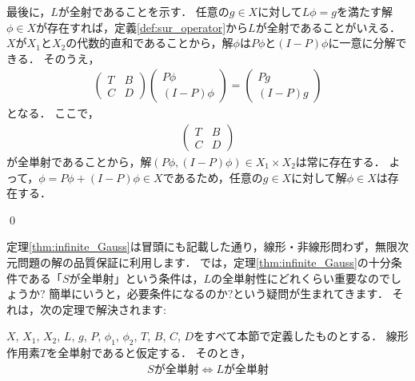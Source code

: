 \begin{Proof}
最後に，$L$が全射であることを示す．
任意の$g \in X$に対して$L \phi = g$を満たす解$\phi \in X$が存在すれば，定義\ref{def:sur_operator}から$L$が全射であることがいえる．
$X$が$X_1$と$X_2$の代数的直和であることから，解$\phi$は$P \phi$と$(I - P)\phi$に一意に分解できる．
そのうえ，
\begin{align*}
	\left( \begin{array}{cc}
		T & B \\
		C & D
	\end{array} \right) \left( \begin{array}{c}
		P \phi \\
		(I - P)\phi
	\end{array} \right) = \left( \begin{array}{c}
		Pg \\
		(I - P)g
	\end{array} \right)
\end{align*}
となる．
ここで，
\begin{align*}
\left( \begin{array}{cc}
		T & B \\
		C & D
	\end{array} \right)
\end{align*}
が全単射であることから，解$ (P \phi, (I - P) \phi ) \in X_1 \times X_2$は常に存在する．
よって，$\phi = P \phi + (I - P) \phi \in X$であるため，任意の$g \in X$に対して解$\phi \in X$は存在する．


\qed
\end{Proof}

定理\ref{thm:infinite_Gauss}は冒頭にも記載した通り，線形・非線形問わず，無限次元問題の解の品質保証に利用します．
では，定理\ref{thm:infinite_Gauss}の十分条件である「$S$が全単射」という条件は，$L$の全単射性にどれくらい重要なのでしょうか?
簡単にいうと，必要条件になるのか?という疑問が生まれてきます．
それは，次の定理で解決されます:

\begin{Thm} \label{thm:invert_S_L}
	$X$, $X_1$, $X_2$, $L$, $g$, $P$, $\phi_1$, $\phi_2$, $T$, $B$, $C$, $D$をすべて本節で定義したものとする．
	線形作用素$T$を全単射であると仮定する．
	そのとき，
	\begin{align*}
		S\mbox{が全単射} \Leftrightarrow L\mbox{が全単射}
	\end{align*}
\end{Thm}

